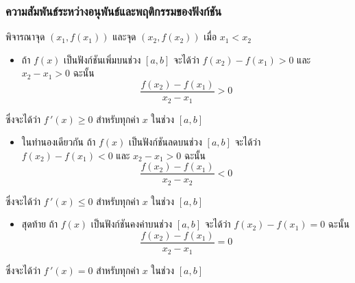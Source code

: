 \begin{frame}[t]
\frametitle{ความสัมพันธ์ระหว่างอนุพันธ์และพฤติกรรมของฟังก์ชัน}
พิจารณาจุด $(x_1,f(x_1))$ และจุด $(x_2, f(x_2))$ เมื่อ $x_1 < x_2$
\begin{slide}
\begin{itemize}
\item ถ้า $f(x)$ เป็นฟังก์ชันเพิ่มบนช่วง $[a,b]$ จะได้ว่า $f(x_2) - f(x_1) > 0$ และ $x_2 - x_1 > 0$ ฉะนั้น 
\[\frac{f(x_2)-f(x_1)}{x_2-x_1} > 0\]
\end{itemize}
ซึ่งจะได้ว่า $f\,'(x) \geq 0$ สำหรับทุกค่า $x$ ในช่วง $[a,b]$
\end{slide}
\end{frame}

\begin{frame}
\begin{slide}
\begin{itemize}
\item ในทำนองเดียวกัน ถ้า $f(x)$ เป็นฟังก์ชันลดบนช่วง $[a,b]$ จะได้ว่า $f(x_2) - f(x_1) < 0$ และ $x_2 - x_1 > 0$ ฉะนั้น 
\[\frac{f(x_2)-f(x_1)}{x_2-x_2} < 0\]
\end{itemize}
ซึ่งจะได้ว่า $f\,'(x) \leq 0$ สำหรับทุกค่า $x$ ในช่วง $[a,b]$
\end{slide}
\end{frame}

\begin{frame}
\begin{slide}
\begin{itemize}
\item สุดท้าย ถ้า $f(x)$ เป็นฟังก์ชันคงค่าบนช่วง $[a,b]$ จะได้ว่า $f(x_2) - f(x_1) = 0$ ฉะนั้น 
\[\frac{f(x_2) - f(x_1)}{x_2 - x_1} = 0\]
\end{itemize}
ซึ่งจะได้ว่า $f\,'(x) = 0$ สำหรับทุกค่า $x$ ในช่วง $[a,b]$
\end{slide}
\end{frame}


